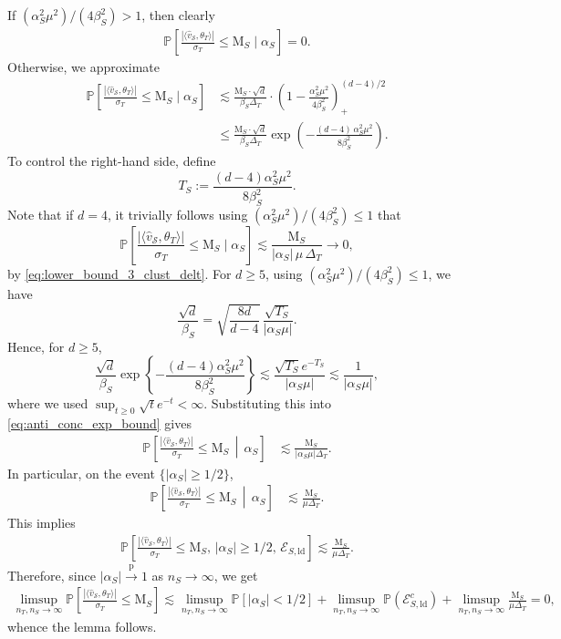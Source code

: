\documentclass[10pt]{article}
\newcommand{\convp}{\xrightarrow{\mathrm{p}}}
\newcommand{\wh}{\widehat}
\newcommand{\trg}{T}
\newcommand{\thetaT}{\theta_{\trg}}
\newcommand{\nT}{n_{\trg}}
\newcommand{\sigmaT}{\sigma_{\trg}}
\newcommand{\DeltaT}{\Delta_{\trg}}
\newcommand{\calS}{\mathcal S}
\newcommand{\src}{S}
\newcommand{\nS}{n_{\src}}
\begin{document}
If $(\alpha^2_\src \mu^2)/(4\beta^2_\src)>1$, then clearly
\begin{align}
    \mathbb P\left[\frac{|\langle \wh v_\calS,\thetaT\rangle|}{\sigmaT} \le \mathrm M_\src \mid \alpha_\src\right]=0.
\end{align}
Otherwise, we approximate
\begin{align}
\label{eq:anti_conc_exp_bound}
     \mathbb P\left[\frac{|\langle \wh v_\calS,\thetaT\rangle|}{\sigmaT} \le \mathrm M_\src \mid \alpha_\src\right] & \lesssim \frac{\mathrm M_\src \cdot \sqrt{d}}{\beta_\src \DeltaT} \cdot \left(1-\frac{\alpha^2_\src \mu^2}{4\beta^2_\src}\right)^{(d-4)/2}_+\\
     & \le \frac{\mathrm M_\src \cdot \sqrt{d}}{\beta_\src \DeltaT} \exp\left(-\frac{(d-4)\,\alpha^2_\src \mu^2}{8\beta^2_\src}\right).
\end{align}
To control the right-hand side, define
\[
T_\src:=\frac{(d-4)\alpha_\src^2\mu^2}{8\beta_\src^2}.
\]
Note that if $d=4$, it trivially follows using $(\alpha^2_\src \mu^2)/(4\beta^2_\src) \le 1$ that
\[
\mathbb P\left[\frac{|\langle \wh v_\calS,\thetaT\rangle|}{\sigmaT} \le \mathrm M_\src \mid \alpha_\src\right] \lesssim \frac{\mathrm M_\src}{|\alpha_\src|\,\mu\,\DeltaT} \to 0,
\]
by \eqref{eq:lower_bound_3_clust_delt}.
For $d \ge 5$, using $(\alpha^2_\src \mu^2)/(4\beta^2_\src) \le 1$, we have
\[
\frac{\sqrt d}{\beta_\src}=\sqrt{\frac{8d}{d-4}}\,\frac{\sqrt{T_\src}}{|\alpha_\src\mu|}.
\]
Hence, for \(d\ge 5\), 
\[
\frac{\sqrt d}{\beta_\src}\exp\left\{-\frac{(d-4)\alpha_\src^2\mu^2}{8\beta_\src^2}\right\}
\lesssim \frac{\sqrt{T_\src}e^{-T_\src}}{|\alpha_\src\mu|}\lesssim\frac{1}{|\alpha_\src\mu|},
\]
where we used $\sup_{t\ge0}\sqrt t e^{-t}<\infty$. Substituting this into
\eqref{eq:anti_conc_exp_bound} gives
\begin{align}
\mathbb P\left[\frac{|\langle \wh v_\calS,\thetaT\rangle|}{\sigmaT}\le \mathrm M_\src\,\middle|\, \alpha_\src\right] &\lesssim\frac{\mathrm M_\src}{|\alpha_\src\mu|\DeltaT}.
\label{eq:anti_conc_final_alpha}
\end{align}
In particular, on the event \(\{|\alpha_\src|\ge 1/2\}\),
\begin{align}
\mathbb P\left[\frac{|\langle \wh v_\calS,\thetaT\rangle|}{\sigmaT}\le \mathrm M_\src\,\middle|\, \alpha_\src\right]
&\lesssim\frac{\mathrm M_\src}{\mu\DeltaT}.
\label{eq:anti_conc_final}
\end{align}
This implies
\begin{align}
  \mathbb P\left[\frac{|\langle \wh v_\calS,\thetaT\rangle|}{\sigmaT}\le \mathrm M_\src,\, |\alpha_\src| \ge 1/2,\,\mathcal E_{\src,\mathrm{ld}}\right]  \lesssim\frac{\mathrm M_\src}{\mu\DeltaT}.
\end{align}
Therefore, since $|\alpha_\src| \convp 1$ as $\nS \to \infty$, we get
\begin{align}
 \limsup_{\nT,\nS \to \infty}\mathbb P\left[\frac{|\langle \wh v_\calS,\thetaT\rangle|}{\sigmaT}\le \mathrm M_\src\right] \lesssim \limsup_{\nT,\nS \to \infty}\mathbb P\left[|\alpha_\src|< 1/2\right]+\limsup_{\nT,\nS \to \infty}\mathbb P\left(\mathcal E^c_{\src,\mathrm{ld}}\right)+\limsup_{\nT,\nS \to \infty}\frac{\mathrm M_\src}{\mu\DeltaT}=0,
\end{align}
whence the lemma follows.
\end{document}
